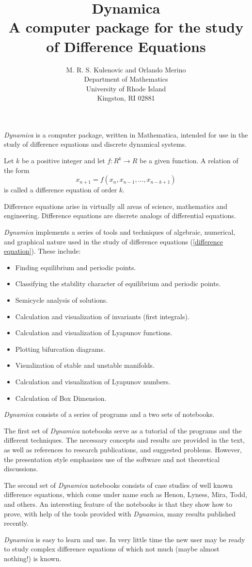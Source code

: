 \documentclass{article}
\title{Dynamica \\
A computer package for the study of Difference Equations}
\author{M. R. S. Kulenovic and Orlando Merino \\
Department of Mathematics \\
University of Rhode Island \\
Kingston, RI 02881}
\date{}
\begin{document}
\maketitle

{\it Dynamica} is a computer package, written in Mathematica,
intended for use in the study of difference equations and discrete dynamical systems.

Let $k$ be a positive integer and let
$f:R^k \rightarrow R$ be a given function.
A relation of the form
\begin{equation}
\label{difference equation}
x_{n+1} = f(x_n, x_{n-1} , \ldots , x_{n-k+1})
\end{equation}
is called a difference equation of order $k$.

Difference equations arise in virtually all areas of science,
mathematics and engineering.  Difference equations are discrete
analogs of differential equations.

{\it Dynamica} implements a series of tools and techniques
of algebraic, numerical, and graphical nature used
in the study of difference equations (\ref{difference equation}).
These include:
\begin{itemize}
\item  Finding equilibrium and periodic points.
\item  Classifying the stability character of equilibrium and periodic points.
\item  Semicycle analysis of solutions.
\item Calculation and visualization of invariants (first integrals).
\item Calculation and visualization of Lyapunov functions.
\item Plotting bifurcation diagrams.
\item Visualization of stable and unstable manifolds.
\item Calculation and visualization of Lyapunov numbers.
\item Calculation of Box Dimension.
\end{itemize}

{\it Dynamica} consists of a series of programs and a two sets of notebooks.

The first set of {\it Dynamica} notebooks serve as a tutorial of the 
programs and the different techniques.  The necessary concepts and 
results are provided in the text, as well as references to research publications, and suggested problems.  However, the presentation style 
emphasizes use of the software and not theoretical discussions.

The second set of {\it Dynamica} notebooks consists of case studies 
of well known difference equations, which come under name such as Henon, Lyness, Mira, Todd, and others.  An interesting feature of the notebooks
is that they show how to prove, with help of the tools provided with
{\it Dynamica}, many results published recently.  

{\it Dynamica} is easy to learn and use.  In very little time the new user
may be ready to study complex difference equations of which not
much (maybe almost nothing!) is known.
\end{document}
